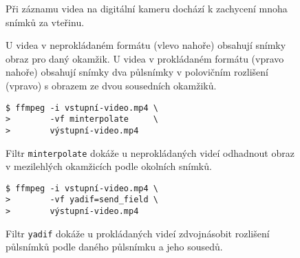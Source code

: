 \begingroup
\begin{subfigure}{\linewidth}

\vspace{-10pt}
\caption{Při záznamu videa na digitální kameru dochází k zachycení mnoha snímků za vteřinu.}
\end{subfigure}
%
\par\vspace{10pt}%
\begin{subfigure}[t]{0.49\linewidth}

\caption{U videa v neprokládaném formátu (vlevo nahoře) obsahují snímky obraz pro daný okamžik. U videa v prokládaném formátu (vpravo nahoře) obsahují snímky dva půlsnímky v polovičním rozlišení (vpravo) s obrazem ze dvou sousedních okamžiků.}
\end{subfigure}\hfill
\begin{subfigure}[t]{0.49\linewidth}

\par\vspace{8pt}%

\end{subfigure}
\par\vspace{10pt}%
\begin{subfigure}[t]{0.49\linewidth}
\begin{verbatim}
$ ffmpeg -i vstupní-video.mp4 \
>        -vf minterpolate     \
>        výstupní-video.mp4
\end{verbatim}

\caption{Filtr \texttt{minterpolate} dokáže u neprokládaných videí odhadnout obraz v mezilehlých okamžicích podle okolních snímků.\footnotemark}
\end{subfigure}\hfill
\begin{subfigure}[t]{0.49\linewidth}
\begin{verbatim}
$ ffmpeg -i vstupní-video.mp4 \
>        -vf yadif=send_field \
>        výstupní-video.mp4
\end{verbatim}

\caption{Filtr \texttt{yadif} dokáže u prokládaných videí zdvojnásobit rozlišení půlsnímků podle daného půlsnímku a jeho sousedů.}
\end{subfigure}
\endgroup